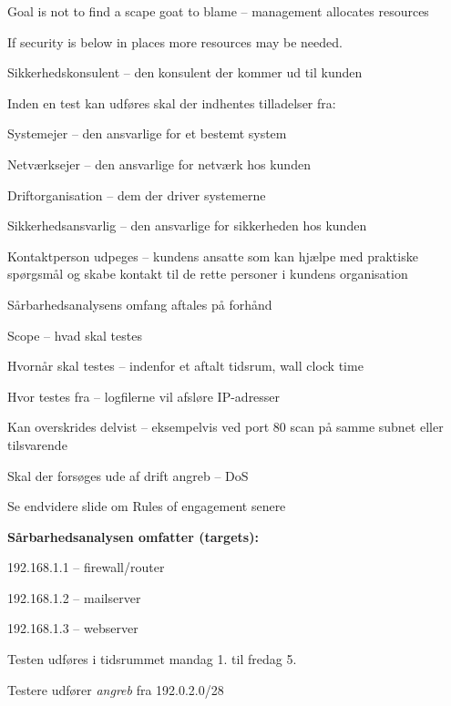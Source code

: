 \documentclass[Screen16to9,17pt]{foils}
\begin{document}
Goal is not to find a scape goat to blame -- management allocates resources

If security is below in places more resources may be needed.




\begin{list1}
\item Sikkerhedskonsulent -- den konsulent der kommer ud til kunden
\item Inden en test kan udføres skal der indhentes tilladelser fra:
\begin{list2}
\item Systemejer -- den ansvarlige for et bestemt system
\item Netværksejer -- den ansvarlige for netværk hos kunden
\item Driftorganisation -- dem der driver systemerne
\item Sikkerhedsansvarlig -- den ansvarlige for sikkerheden hos kunden
\item Kontaktperson udpeges -- kundens ansatte som kan hjælpe med praktiske
  spørgsmål og skabe kontakt til de rette personer i kundens organisation
\end{list2}
\end{list1}


\begin{list1}
\item Sårbarhedsanalysens omfang aftales på forhånd
\begin{list2}
\item Scope -- hvad skal testes
\item Hvornår skal testes -- indenfor et aftalt tidsrum, wall clock time
\item Hvor testes fra -- logfilerne vil afsløre IP-adresser
\item Kan overskrides delvist -- eksempelvis ved port 80 scan på samme
  subnet eller tilsvarende
\item Skal der forsøges ude af drift angreb -- DoS
\item Se endvidere slide om Rules of engagement senere
\end{list2}
\item {\bf Sårbarhedsanalysen omfatter (targets):}
\begin{list2}
\item 192.168.1.1 -- firewall/router
\item 192.168.1.2 -- mailserver
\item 192.168.1.3 -- webserver
\item Testen udføres i tidsrummet mandag 1. til fredag 5.
\item Testere udfører \emph{angreb} fra 192.0.2.0/28
\end{list2}
\end{list1}
\end{document}
